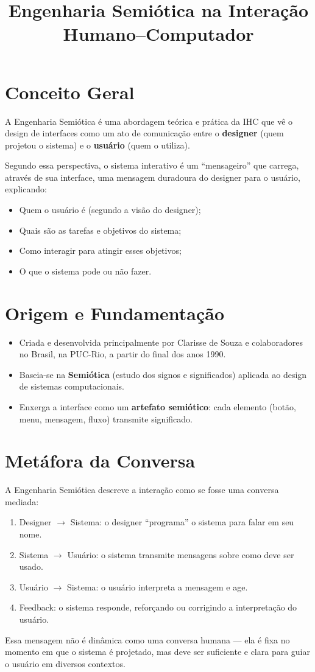 \documentclass[12pt,a4paper]{article}
\title{\textbf{Engenharia Semiótica na Interação Humano–Computador}}
\author{}
\date{}
\begin{document}
\maketitle

\section{Conceito Geral}
A Engenharia Semiótica é uma abordagem teórica e prática da IHC que vê o design de interfaces como um ato de comunicação entre o \textbf{designer} (quem projetou o sistema) e o \textbf{usuário} (quem o utiliza).

Segundo essa perspectiva, o sistema interativo é um ``mensageiro'' que carrega, através de sua interface, uma mensagem duradoura do designer para o usuário, explicando:
\begin{itemize}
    \item Quem o usuário é (segundo a visão do designer);
    \item Quais são as tarefas e objetivos do sistema;
    \item Como interagir para atingir esses objetivos;
    \item O que o sistema pode ou não fazer.
\end{itemize}

\section{Origem e Fundamentação}
\begin{itemize}
    \item Criada e desenvolvida principalmente por Clarisse de Souza e colaboradores no Brasil, na PUC-Rio, a partir do final dos anos 1990.
    \item Baseia-se na \textbf{Semiótica} (estudo dos signos e significados) aplicada ao design de sistemas computacionais.
    \item Enxerga a interface como um \textbf{artefato semiótico}: cada elemento (botão, menu, mensagem, fluxo) transmite significado.
\end{itemize}

\section{Metáfora da Conversa}
A Engenharia Semiótica descreve a interação como se fosse uma conversa mediada:
\begin{enumerate}
    \item Designer $\rightarrow$ Sistema: o designer ``programa'' o sistema para falar em seu nome.
    \item Sistema $\rightarrow$ Usuário: o sistema transmite mensagens sobre como deve ser usado.
    \item Usuário $\rightarrow$ Sistema: o usuário interpreta a mensagem e age.
    \item Feedback: o sistema responde, reforçando ou corrigindo a interpretação do usuário.
\end{enumerate}
Essa mensagem não é dinâmica como uma conversa humana — ela é fixa no momento em que o sistema é projetado, mas deve ser suficiente e clara para guiar o usuário em diversos contextos.
\end{document}
